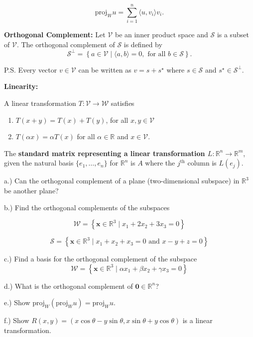 \documentclass{article}
\begin{document}
$$\text{proj}_W u = \sum_{i=1}^n \langle u,v_i\rangle v_i.$$


\textbf{Orthogonal Complement:} Let $\mathcal{V}$ be an inner product space and $\mathcal{S}$ is a subset of $\mathcal{V}$. The orthogonal complement of $\mathcal{S}$ is defined by $$\mathcal{S}^\perp = \left\{a\in\mathcal{V}\mid \langle a,b\rangle = 0, \text{ for all }b\in\mathcal{S}\right\}.$$

P.S. Every vector $v\in\mathcal{V}$ can be written as $v=s+s^\star$ where $s\in\mathcal{S}$ and $s^\star\in \mathcal{S}^\perp$. 

\textbf{Linearity:}

A linear transformation $T:\mathcal{V}\rightarrow \mathcal{W}$ satisfies 

\begin{enumerate}
\item $T(x+y)=T(x)+T(y)$, for all $x,y\in \mathcal{V}$
\item $T(\alpha x) = \alpha T(x)$ for all $\alpha \in \mathbb{R}$ and $x\in \mathcal{V}$. 
\end{enumerate}

The \textbf{standard matrix representing a linear transformation $L:\mathbb{R}^n\rightarrow\mathbb{R}^m$}, given the natural basis $\{e_1, \dots, e_n\}$ for $\mathbb{R}^n$ is $A$ where the $j^\text{th}$ column is $L(e_j)$. 



\medskip



a.) Can the orthogonal complement of a plane (two-dimensional subspace) in $\mathbb{R}^3$ be another plane? 

b.) Find the orthogonal complements of the subspaces 

$$\mathcal{W} = \left\{ \mathbf{x}\in\mathbb{R}^3 \mid x_1 + 2x_2 + 3x_3 = 0 \right\}$$

$$\mathcal{S} = \left\{ \mathbf{x}\in\mathbb{R}^3 \mid x_1+x_2+x_3=0 \text{ and }x-y+z=0 \right\}$$

c.) Find a basis for the orthogonal complement of the subspace 
$$\mathcal{W} = \left\{ \mathbf{x}\in\mathbb{R}^3 \mid \alpha x_1 + \beta x_2 + \gamma x_3 = 0 \right\}$$

d.) What is the orthogonal complement of $\mathbf{0}\in\mathbb{R}^n$?


e.) Show $\text{proj}_W( \text{proj}_W u ) = \text{proj}_W u$.

f.) Show $R(x,y)=(x\cos \theta - y \sin\theta, x\sin \theta + y \cos \theta)$ is a linear transformation. 
\end{document}
